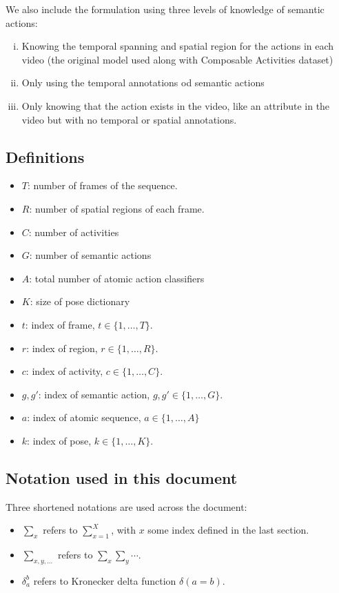 \documentclass[10pt,letterpaper]{article}
\newcommand{\+}[1]{\ensuremath{{\boldsymbol #1}}}
\begin{document}
We also include the formulation using three levels of knowledge of semantic actions:
\begin{enumerate}[i.]
\item Knowing the temporal spanning and spatial region for the actions in each video (the original model used along with Composable Activities dataset)
\item Only using the temporal annotations od semantic actions
\item Only knowing that the action exists in the video, like an attribute in the video but with no temporal or spatial annotations.
\end{enumerate}

\subsection{Definitions}
\begin{itemize}
\item $T$: number of frames of the sequence.
\item $R$: number of spatial regions of each frame.
\item $C$: number of activities
\item $G$: number of semantic actions
\item $A$: total number of atomic action classifiers
\item $K$: size of pose dictionary
\item $t$: index of frame, $t \in \{1,\dots,T\}$.
\item $r$: index of region, $r \in \{1,\dots,R\}$.
\item $c$: index of activity, $c \in \{1,\dots,C\}$.
\item $g,g'$: index of semantic action, $g,g' \in \{1,\dots,G\}$.
\item $a$: index of atomic sequence, $a \in \{1,\dots,A\}$
\item $k$: index of pose, $k \in \{1,\dots,K\}$.
\end{itemize}

\subsection{Notation used in this document}
Three shortened notations are used across the document:
\begin{itemize}
\item $\sum_x$ refers to $\sum_{x=1}^X$, with $x$ some index defined in the last section.
\item $\sum_{x,y,...}$ refers to $\sum_x \sum_y \cdots$.
\item $\delta_a^b$ refers to Kronecker delta function $\delta(a = b)$.
\end{itemize}
\end{document}
